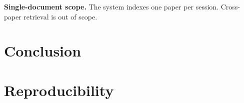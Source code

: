 \documentclass[conference]{IEEEtran}
\newif\ifdraftmode
\newcommand{\TODO}[1]{\ifdraftmode\textcolor{red}{\textbf{[TODO: #1]}}\fi}
\begin{document}
\textbf{Single-document scope.} The system indexes one paper per session.
Cross-paper retrieval is out of scope.

\section{Conclusion}

\TODO{Write last. State only what the experiments in Section V support. If the
directive ablation shows no effect, that is a publishable negative result about
prompt-level consistency checking --- report it as such rather than reframing
the paper around the retrieval comparison, which is not novel.}

\section*{Reproducibility}

\TODO{State the model identifier and version, embedding model revision,
retrieval hyperparameters ($k=60$ for both candidate depth and the RRF
constant), decoding temperature, and the date of API access. Release the
annotated corpus, the perturbation set, and the evaluation harness. Note that
results depend on a hosted model whose behaviour may change; the access date
is not optional.}
\end{document}
